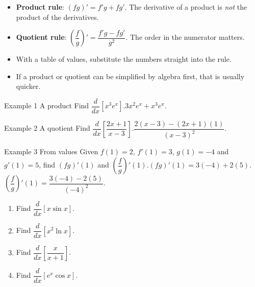\documentclass[11pt]{article}
\begin{document}

\begin{ideabox}
\begin{itemize}[leftmargin=*,itemsep=2pt,topsep=2pt]
  \item \textbf{Product rule}: $(fg)'=f'g+fg'$. The derivative of a product is \emph{not} the product of the derivatives.
  \item \textbf{Quotient rule}: $\left(\dfrac fg\right)'=\dfrac{f'g-fg'}{g^2}$. The order in the numerator matters.
  \item With a table of values, substitute the numbers straight into the rule.
  \item If a product or quotient can be simplified by algebra first, that is usually quicker.
\end{itemize}
\end{ideabox}

\begin{example}{Example 1 \textperiodcentered{} A product}
Find $\dfrac{d}{dx}\left[x^3e^{x}\right]$.\soln $3x^2e^{x}+x^3e^{x}$.
\end{example}

\begin{example}{Example 2 \textperiodcentered{} A quotient}
Find $\dfrac{d}{dx}\left[\dfrac{2x+1}{x-3}\right]$.\soln $\dfrac{2(x-3)-(2x+1)(1)}{(x-3)^2}$.
\end{example}

\begin{example}{Example 3 \textperiodcentered{} From values}
Given $f(1)=2$, $f'(1)=3$, $g(1)=-4$ and $g'(1)=5$, find $(fg)'(1)$ and $\left(\dfrac fg\right)'(1)$.\soln $(fg)'(1)=3(-4)+2(5)$. \ $\left(\dfrac fg\right)'(1)=\dfrac{3(-4)-2(5)}{(-4)^2}$.
\end{example}

\newpage
{}

\begin{enumerate}[leftmargin=*,itemsep=2pt]
  \item Find $\dfrac{d}{dx}[x\sin x]$.\work{2.3cm}
  \item Find $\dfrac{d}{dx}\left[x^2\ln x\right]$.\work{2.3cm}
  \item Find $\dfrac{d}{dx}\left[\dfrac{x}{x+1}\right]$.\work{2.3cm}
  \item Find $\dfrac{d}{dx}\left[e^{x}\cos x\right]$.\work{2.3cm}
\end{enumerate}
\end{document}
